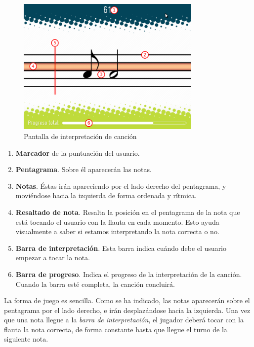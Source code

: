 \begin{figure}[h!]
  \centering
  \includegraphics[width=0.8\textwidth]{apendice_manual_usuario/imagen_seccionCanciones2}
  \caption{Pantalla de interpretación de canción}
\end{figure}

\begin{enumerate}
\item \textbf{Marcador} de la puntuación del usuario.
\item \textbf{Pentagrama}. Sobre él aparecerán las notas.
\item \textbf{Notas}. Éstas irán apareciendo por el lado derecho del pentagrama,
  y moviéndose hacia la izquierda de forma ordenada y rítmica.
\item \textbf{Resaltado de nota}\label{barra_resaltado}. Resalta la posición en
  el pentagrama de la nota que está tocando el usuario con la flauta en cada
  momento. Esto ayuda visualmente a saber si estamos interpretando la nota
  correcta o no.
\item \textbf{Barra de interpretación}. Esta barra indica cuándo debe el usuario
  empezar a tocar la nota. 
\item \textbf{Barra de progreso}. Indica el progreso de la interpretación de la
  canción. Cuando la barra esté completa, la canción concluirá.
\end{enumerate}

La forma de juego es sencilla. Como se ha indicado, las notas aparecerán sobre
el pentagrama por el lado derecho, e irán desplazándose hacia la izquierda. Una
vez que una nota llegue a la \textit{barra de interpretación}, el jugador deberá
tocar con la flauta la nota correcta, de forma constante hasta que llegue el
turno de la siguiente nota.

